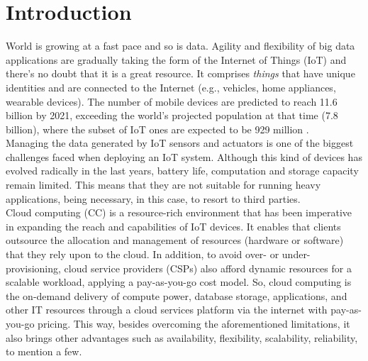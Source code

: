 \section{Introduction}\label{sec:Introduction}
\noindent
World is growing at a fast pace and so is data. Agility and flexibility of big data applications are gradually taking the form of the Internet of Things (IoT) and there’s no doubt that it is a great resource. It comprises \textit{things} that have unique identities and are connected to the Internet (e.g., vehicles, home appliances, wearable devices). The number of mobile devices are predicted to reach 11.6 billion by 2021, exceeding the world’s projected population at that time (7.8 billion), where the subset of IoT ones are expected to be 929 million \cite{CiscoVis16:online}. \\
\noindent\tab Managing the data generated by IoT sensors and actuators is one of the biggest challenges faced when deploying an IoT system. Although this kind of devices has evolved radically in the last years, battery life, computation and storage capacity remain limited. This means that they are not suitable for running heavy applications, being necessary, in this case, to resort to third parties.\\
\noindent\tab Cloud computing (CC) is a resource-rich environment that has been imperative in expanding the reach and capabilities of IoT devices. It enables that clients outsource the allocation and management of resources (hardware or software) that they rely upon to the cloud. In addition, to avoid over- or under-provisioning, cloud service providers (CSPs) also afford dynamic resources for a scalable workload, applying a pay-as-you-go cost model. So, cloud computing is the on-demand delivery of compute power, database storage, applications, and other IT resources through a cloud services platform via the internet with pay-as-you-go pricing. %
This way, besides overcoming the aforementioned limitations, it also brings other advantages such as availability, flexibility, scalability, reliability, to mention a few.\\

